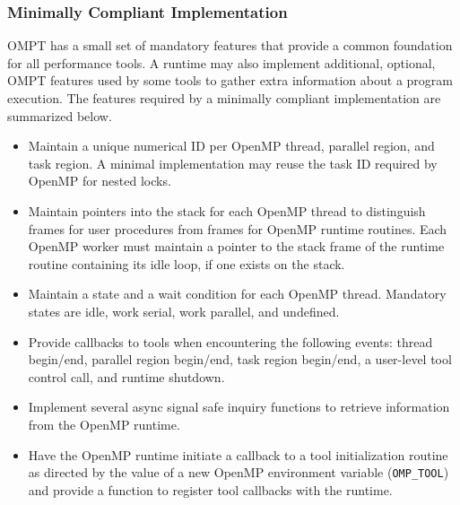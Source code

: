 \documentclass{article}
\begin{document}
\subsubsection{Minimally Compliant Implementation}

OMPT has a small set of mandatory features that provide a common foundation for all performance tools. A runtime may also implement additional, optional, OMPT features used by some tools to gather extra information about a program execution.     
The features required by a minimally compliant implementation are summarized below.

\begin{itemize}
\item Maintain a unique numerical ID per OpenMP thread, parallel region, and task region. A minimal implementation may reuse the task ID required by OpenMP for nested locks.
\item Maintain pointers into the stack for each OpenMP thread to distinguish frames for user procedures from frames for OpenMP runtime routines.  Each  OpenMP worker must maintain a pointer to the stack frame of the runtime routine containing its idle loop, if one exists on the stack. 
\item Maintain a state and a wait condition for each OpenMP thread. Mandatory states are idle, work serial, work parallel, and undefined.
\item Provide callbacks to tools when encountering the following  events:  thread begin/end, parallel region begin/end, task region begin/end, a user-level tool control call, and runtime shutdown.
\item Implement several async signal safe inquiry functions to retrieve information from the OpenMP runtime.
\item Have the OpenMP runtime initiate a callback to a tool initialization routine 
as directed by the value of a new OpenMP environment variable (\verb|OMP_TOOL|) and provide a function to register tool callbacks with the runtime.
\end{itemize}
\end{document}
